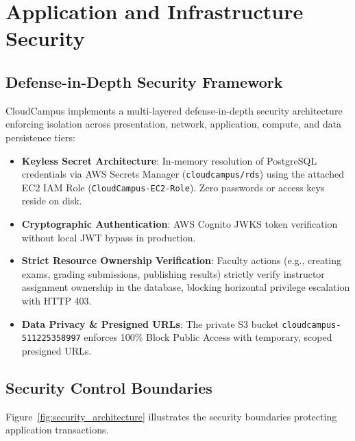 \newpage
\section{Application and Infrastructure Security}

\subsection{Defense-in-Depth Security Framework}
CloudCampus implements a multi-layered defense-in-depth security architecture enforcing isolation across presentation, network, application, compute, and data persistence tiers:

\begin{itemize}[leftmargin=*,itemsep=1pt]
    \item \textbf{Keyless Secret Architecture}: In-memory resolution of PostgreSQL credentials via AWS Secrets Manager (\texttt{cloudcampus/rds}) using the attached EC2 IAM Role (\texttt{CloudCampus-EC2-Role}). Zero passwords or access keys reside on disk.
    \item \textbf{Cryptographic Authentication}: AWS Cognito JWKS token verification without local JWT bypass in production.
    \item \textbf{Strict Resource Ownership Verification}: Faculty actions (e.g., creating exams, grading submissions, publishing results) strictly verify instructor assignment ownership in the database, blocking horizontal privilege escalation with HTTP 403.
    \item \textbf{Data Privacy \& Presigned URLs}: The private S3 bucket \texttt{cloudcampus-511225358997} enforces 100\% Block Public Access with temporary, scoped presigned URLs.
\end{itemize}

\subsection{Security Control Boundaries}
Figure~\ref{fig:security_architecture} illustrates the security boundaries protecting application transactions.

